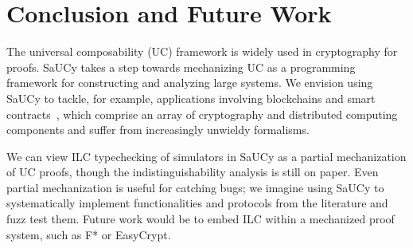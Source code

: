 \section{Conclusion and Future Work}
\label{sec:conclusion}

The universal composability (UC) framework is widely used in cryptography
for proofs.
SaUCy takes a step towards mechanizing UC as a programming
framework for constructing and analyzing large systems.
%
%
We envision using SaUCy to tackle, for example, applications involving blockchains and smart contracts~\cite{dziembowski2018general,miller2017sprites,dziembowski2017perun}, which comprise an array of cryptography and distributed computing components and suffer from increasingly unwieldy formalisms.

We can view ILC typechecking of simulators in SaUCy as a partial
mechanization of UC proofs, though the indistinguishability analysis
is still on paper.
Even partial mechanization is useful for catching
bugs; we imagine using SaUCy to systematically implement
functionalities and protocols from the literature and fuzz test
them.
Future work would be to embed ILC within a mechanized proof system,
such as F* or EasyCrypt.

